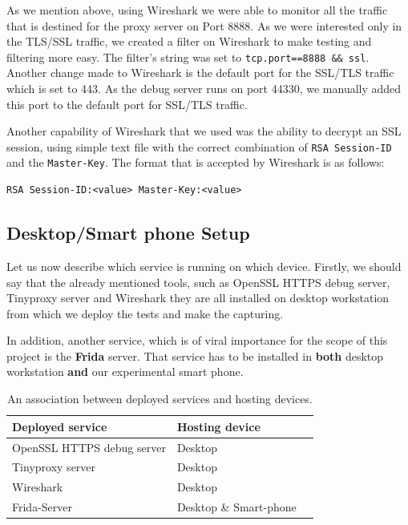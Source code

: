 \documentclass[12pt, a4paper]{report}
\begin{document}
As we mention above, using Wireshark we were able to monitor all the traffic  that is destined for the proxy server on Port 8888. As we were interested only in the TLS/SSL traffic, we created a filter on Wireshark to make testing and filtering more easy. The filter's string was set to \texttt{tcp.port==8888 \&\& ssl}. Another change made to Wireshark is the default port for the SSL/TLS traffic which is set to 443. As the debug server runs on port 44330, we manually added this port to the default port for SSL/TLS traffic.  

Another capability of Wireshark that we used was the ability to decrypt an SSL session, using simple text file with the correct combination of \texttt{RSA Session-ID} and the \texttt{Master-Key}. The format that is accepted by Wireshark is as follows:
\begin{lstlisting}[frame=single, breaklines=true]
RSA Session-ID:<value> Master-Key:<value>		
\end{lstlisting}

\subsection{Desktop/Smart phone Setup}

Let us now describe which service is running on which device. Firstly, we should say that the already mentioned tools, such as OpenSSL HTTPS debug server, Tinyproxy server and Wireshark they are all installed on desktop workstation from which we deploy the tests and make the capturing.

In addition, another service, which is of viral importance for the scope of this project is the \textbf{Frida} server. That service has to be installed in \textbf{both} desktop workstation \textbf{and} our experimental smart phone.

\begin{table}[h]
\centering
    \begin{tabular}{ | l | l | p{5cm} |}
    \hline
    \textbf{Deployed service} & \textbf{Hosting device} \\ \hline
    OpenSSL HTTPS debug server & Desktop \\ \hline 
    Tinyproxy server & Desktop \\ \hline
    Wireshark & Desktop \\ \hline
    Frida-Server & Desktop \& Smart-phone \\ \hline
    \end{tabular}
    \caption{An association between deployed services and hosting devices.}
\end{table}
\end{document}
